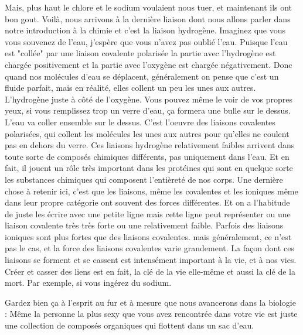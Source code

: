 Mais, plus haut le chlore et le sodium voulaient nous
tuer, et maintenant ils ont bon gout. Voilà, nous arrivons à la dernière
liaison dont nous allons parler dans notre introduction à la chimie et
c'est la liaison hydrogène. Imaginez que vous vous souvenez de l'eau,
j'espère que vous n'avez pas oublié l'eau. Puisque l'eau est "collée"
par une liaison covalente polarisée la partie avec l'hydrogène est
chargée positivement et la partie avec l'oxygène est chargée
négativement. Donc quand nos molécules d'eau se déplacent, généralement
on pense que c'est un fluide parfait, mais en réalité, elles collent un
peu les unes aux autres. L'hydrogène juste à côté de l'oxygène. Vous
pouvez même le voir de vos propres yeux, si vous remplissez trop un
verre d'eau, ça formera une bulle sur le dessus. L'eau va coller
ensemble sur le dessus. C'est l'oeuvre des liaisons covalentes
polarisées, qui collent les molécules les unes aux autres pour qu'elles
ne coulent pas en dehors du verre. Ces liaisons hydrogène relativement
faibles arrivent dans toute sorte de composés chimiques différents, pas
uniquement dans l'eau. Et en fait, il jouent un rôle très important dans
les protéines qui sont en quelque sorte les substances chimiques qui
composent l'entièreté de nos corps. Une dernière chose à retenir ici,
c'est que les liaisons, même les covalentes et les ioniques même dans
leur propre catégorie ont souvent des forces différentes. Et on a
l'habitude de juste les écrire avec une petite ligne mais cette ligne
peut représenter ou une liaison covalente très très forte ou une
relativement faible. Parfois des liaisons ioniques sont plus fortes que
des liaisons covalentes. mais généralement, ce n'est pas le cas, et la
force des liaisons covalentes varie grandement. La façon dont ces
liaisons se forment et se cassent est intensément important à la vie, et
à nos vies. Créer et casser des liens est en fait, la clé de la vie
elle-même et aussi la clé de la mort. Par exemple, si vous ingérez du
sodium.

Gardez bien ça à l'esprit au fur et à mesure que nous avancerons dans la
biologie : Même la personne la plus sexy que vous avez rencontrée dans
votre vie est juste une collection de composés organiques qui flottent
dans un sac d'eau.
